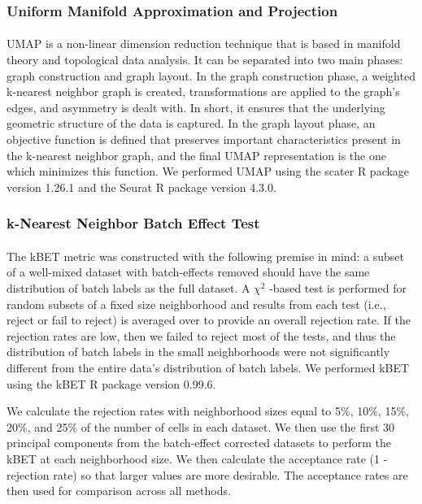 \documentclass[unnumsec,webpdf,contemporary,large]{oup-authoring-template}%
\theoremstyle{thmstyleone}%
\theoremstyle{thmstyletwo}%
\theoremstyle{thmstylethree}%
\begin{document}
\subsubsection*{Uniform Manifold Approximation and Projection}

\paragraph*{}
UMAP is a non-linear dimension reduction technique \citep{mcinnes2018umap} that is based in manifold theory and topological data analysis. It can be separated into two main phases: graph construction and graph layout. In the graph construction phase, a weighted k-nearest neighbor graph is created, transformations are applied to the graph's edges, and asymmetry is dealt with. In short, it ensures that the underlying geometric structure of the data is captured. In the graph layout phase, an objective function is defined that preserves important characteristics present in the k-nearest neighbor graph, and the final UMAP representation is the one which minimizes this function. We performed UMAP using the scater R package \citep{davis2017scater} version 1.26.1 and the Seurat R package \citep{stuart2019comprehensive} version 4.3.0.

\subsubsection*{k-Nearest Neighbor Batch Effect Test}

\paragraph*{}
The kBET metric \citep{buttner2019test} was constructed with the following premise in mind: a subset of a well-mixed dataset with batch-effects removed should have the same distribution of batch labels as the full dataset. A $\chi^2$ -based test is performed for random subsets of a fixed size neighborhood and results from each test (i.e., reject or fail to reject) is averaged over to provide an overall rejection rate. If the rejection rates are low, then we failed to reject most of the tests, and thus the distribution of batch labels in the small neighborhoods were not significantly different from the entire data's distribution of batch labels. We performed kBET using the kBET R package \citep{buttner2017kbet} version 0.99.6.

We calculate the rejection rates with neighborhood sizes equal to 5\%, 10\%, 15\%, 20\%, and 25\% of the number of cells in each dataset. We then use the first 30 principal components from the batch-effect corrected datasets to perform the kBET at each neighborhood size. We then calculate the acceptance rate (1 - rejection rate) so that larger values are more desirable. The acceptance rates are then used for comparison across all methods.
\end{document}
